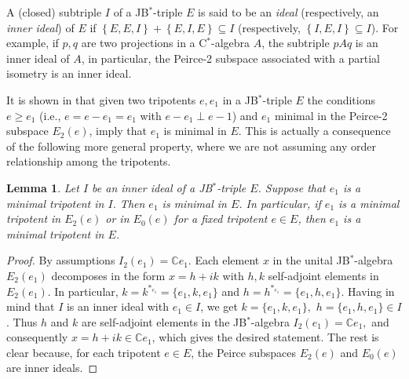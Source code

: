 \documentclass[10pt]{amsart}
\newtheorem{lemma}[theorem]{Lemma}
\def\J#1#2#3{ \left\{ #1,#2,#3 \right\} }
\begin{document}
	A (closed) subtriple $I$ of a JB$^*$-triple $E$ is said to be an \emph{ideal} (respectively, an \emph{inner ideal}) of $E$ if $\J EEI + \J EIE\subseteq I$ (respectively, $\J IEI \subseteq I$). For example, if $p,q$ are two projections in a C$^*$-algebra $A$, the subtriple $p A q$ is an inner ideal of $A$, in particular, the Peirce-2 subspace associated with a partial isometry is an inner ideal.
	
	It is shown in \cite[Lemma 3.2]{Santos2014} that given two tripotents $e, e_1$ in a JB$^*$-triple $E$ the conditions $e\geq e_1$ (i.e., $e = e-e_1 = e_1$ with $e-e_1\perp e-1$) and $e_1$ minimal in the Peirce-2 subspace $E_2(e)$, imply that $e_1$ is minimal in $E$. This is actually a consequence of the following more general property, where we are not assuming any order relationship among the tripotents.
	
	\begin{lemma}\label{l minimal tripotents in inner ideals} Let $I$ be an inner ideal of a JB$^*$-triple $E$. Suppose that $e_1$ is a minimal tripotent in $I$. Then $e_1$ is minimal in $E$. In particular, if $e_1$ is a minimal tripotent in $E_2(e)$ or in $E_0(e)$ for a fixed tripotent $e\in E$, then $e_1$ is a minimal tripotent in $E$.
	\end{lemma}
	
	\begin{proof} By assumptions $I_2(e_1)= \mathbb{C} e_1$. Each element $x$ in the unital JB$^*$-algebra $E_2(e_1)$ decomposes in the form $x = h + i k$ with $h,k$ self-adjoint elements in $E_2(e_1)$. In particular, $k = k^{*_{e_1}} = \{e_1,k, e_1\}$ and $h = h^{*_{e_1}} = \{e_1, h, e_1\}$. Having in mind that $I$ is an inner ideal with $e_1\in I$, we get $k = \{e_1,k, e_1\},$ $h = \{e_1, h, e_1\}\in I$. Thus $h$ and $k$ are self-adjoint elements in the JB$^*$-algebra $I_2 (e_1) = \mathbb{C} e_1,$ and consequently $x = h +i k \in \mathbb{C} e_1$, which gives the desired statement. The rest is clear because, for each tripotent $e\in E$, the Peirce subspaces $E_2(e)$ and $E_0(e)$ are inner ideals.
	\end{proof}
	
\end{document}
